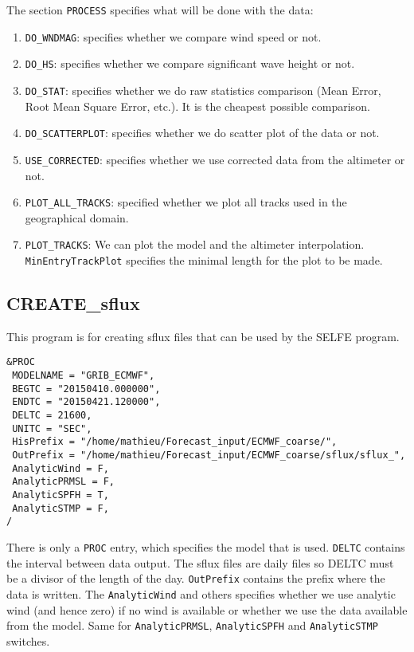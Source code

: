 \documentclass[12pt]{amsart}
\begin{document}
The section {\tt PROCESS} specifies what will be done with the data:
\begin{enumerate}
\item {\tt DO\_WNDMAG}: specifies whether we compare wind speed or not.
\item {\tt DO\_HS}: specifies whether we compare significant wave height or not.
\item {\tt DO\_STAT}: specifies whether we do raw statistics comparison (Mean Error, Root Mean Square Error, etc.). It is the cheapest possible comparison.
\item {\tt DO\_SCATTERPLOT}: specifies whether we do scatter plot of the data or not.
\item {\tt USE\_CORRECTED}: specifies whether we use corrected data from the altimeter or not.
\item {\tt PLOT\_ALL\_TRACKS}: specified whether we plot all tracks used in the geographical domain.
\item {\tt PLOT\_TRACKS}: We can plot the model and the altimeter interpolation. {\tt MinEntryTrackPlot} specifies the minimal length for the plot to be made.
\end{enumerate}


\subsection{CREATE\_sflux}

This program is for creating sflux files that can be used by the SELFE program.
\begin{verbatim}
&PROC
 MODELNAME = "GRIB_ECMWF", 
 BEGTC = "20150410.000000",
 ENDTC = "20150421.120000",
 DELTC = 21600, 
 UNITC = "SEC", 
 HisPrefix = "/home/mathieu/Forecast_input/ECMWF_coarse/", 
 OutPrefix = "/home/mathieu/Forecast_input/ECMWF_coarse/sflux/sflux_", 
 AnalyticWind = F,
 AnalyticPRMSL = F,
 AnalyticSPFH = T,
 AnalyticSTMP = F,
/
\end{verbatim}
There is only a {\tt PROC} entry, which specifies the model that is used. {\tt DELTC} contains the interval between data output. The sflux files are daily files so DELTC must be a divisor of the length of the day.
{\tt OutPrefix} contains the prefix where the data is written.
The {\tt AnalyticWind} and others specifies whether we use analytic wind (and hence zero) if no wind is available or whether we use the data available from the model. Same for {\tt AnalyticPRMSL}, {\tt AnalyticSPFH} and {\tt AnalyticSTMP} switches.
\end{document}

